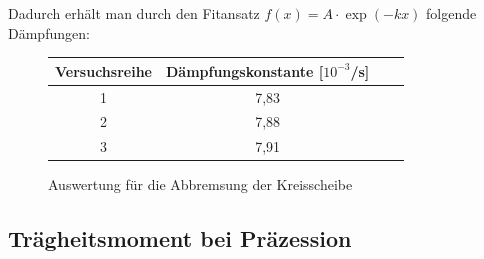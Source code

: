 \documentclass[fontsize=12pt]{scrartcl}
\begin{document}
Dadurch erhält man durch den Fitansatz $f(x)=A\cdot\exp(-kx)$ folgende Dämpfungen:
\begin{figure}[H]
\centering
\caption{Auswertung für die Abbremsung der Kreisscheibe}
\begin{tabular}{|c|c|c|c|} \hline
Versuchsreihe & Dämpfungskonstante [$10^{-3}$/s] \\ \hline
1 & 7,83 \\ \hline
2&  7,88 \\ \hline
3& 7,91 \\ \hline
\end{tabular}				 
\end{figure}
\newpage

\subsection{Trägheitsmoment bei Präzession}
\end{document}
